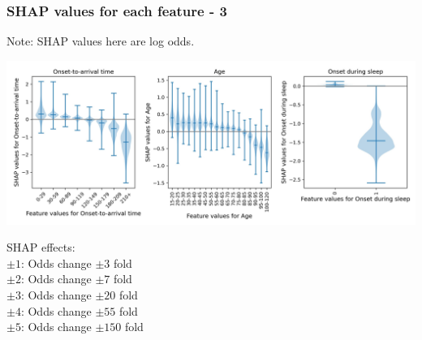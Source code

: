 \begin{frame}
\frametitle{SHAP values for each feature - 3}
Note: SHAP values here are log odds. 
\begin{center}
\includegraphics[width=1.0\textwidth]{./images/03d_xgb_10_features_thrombolysis_shap_violin_3.jpg}
\end{center}
\scriptsize
SHAP effects: \\
$\pm1$: Odds change $\pm3$ fold\\
$\pm2$: Odds change $\pm7$ fold\\
$\pm3$: Odds change $\pm20$ fold\\
$\pm4$: Odds change $\pm55$ fold\\
$\pm5$: Odds change $\pm150$ fold
\end{frame}